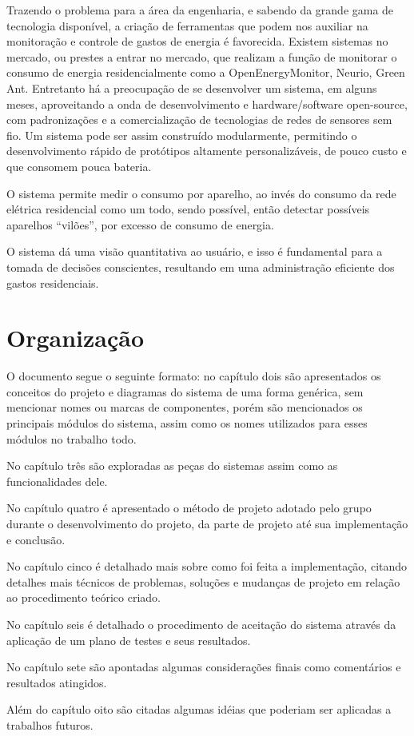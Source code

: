 Trazendo o problema para a área da engenharia, e sabendo da grande gama de tecnologia disponível, a criação de ferramentas que podem nos auxiliar na monitoração e controle de gastos de energia é favorecida. Existem sistemas no mercado, ou prestes a entrar no mercado, que realizam a função de monitorar o consumo de energia residencialmente como a OpenEnergyMonitor\cite{open_energy_monitor}, Neurio\cite{neurio_site}, Green Ant\cite{green_ant_site}. Entretanto há a preocupação de se desenvolver um sistema, em alguns meses, aproveitando a onda de desenvolvimento e hardware/software open-source, com padronizações e a comercialização de tecnologias de redes de sensores sem fio. Um sistema pode ser assim construído modularmente, permitindo o desenvolvimento rápido de protótipos altamente personalizáveis, de pouco custo e que consomem pouca bateria.

O sistema permite medir o consumo por aparelho, ao invés do consumo da rede elétrica residencial como um todo, sendo possível, então detectar possíveis aparelhos “vilões”, por excesso de consumo de energia.

O sistema dá uma visão quantitativa ao usuário, e isso é fundamental para a tomada de decisões conscientes, resultando em uma administração eficiente dos gastos residenciais.

\section{Organização}
\label{Sec:organizacao}

O documento segue o seguinte formato: no capítulo dois são apresentados os conceitos do projeto e diagramas do sistema de uma forma genérica, sem mencionar nomes ou marcas de componentes, porém são mencionados os principais módulos do sistema, assim como os nomes utilizados para esses módulos no trabalho todo.

No capítulo três são exploradas as peças do sistemas assim como as funcionalidades dele.

No capítulo quatro é apresentado o método de projeto adotado pelo grupo durante o desenvolvimento do projeto, da parte de projeto até sua implementação e conclusão.

No capítulo cinco é detalhado mais sobre como foi feita a implementação, citando detalhes mais técnicos de problemas, soluções e mudanças de projeto em relação ao procedimento teórico criado.

No capítulo seis é detalhado o procedimento de aceitação do sistema através da aplicação de um plano de testes e seus resultados.

No capítulo sete são apontadas algumas considerações finais como comentários e resultados atingidos.

Além do capítulo oito são citadas algumas idéias que poderiam ser aplicadas a trabalhos futuros.